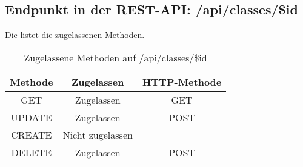 \subsection{Endpunkt in der REST-API: /api/classes/\$id}
Die  listet die zugelassenen Methoden. 

\begin{table}[!htbp]
	\begin{tabular}{|c|c|c|}
		\hline
			\textbf{Methode} & \textbf{Zugelassen} & \textbf{HTTP-Methode} \\ \hline
			GET & Zugelassen & GET \\ \hline
			UPDATE & Zugelassen & POST \\ \hline 
			CREATE & Nicht zugelassen & \\ \hline 
			DELETE & Zugelassen & POST \\ \hline
	\end{tabular}

		\caption{Zugelassene Methoden auf /api/classes/\$id}
		\label{tab:end:rest:api:classes:id:meth}
\end{table}